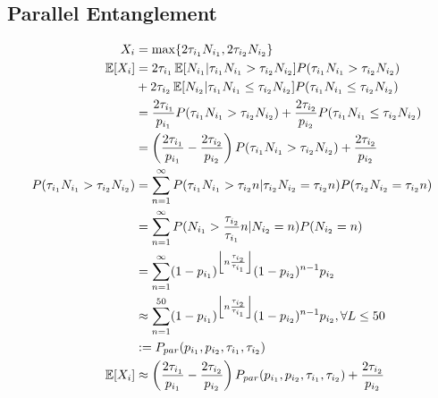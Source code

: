 \subsection{Parallel Entanglement}
\begingroup
\allowdisplaybreaks
\begin{align*}
    X_i                                      & = \max\{2\tau_{i_1}N_{i_1}, 2\tau_{i_2}N_{i_2}\}                                                                                                            \\
    \operatorname*{\mathbb{E}}[X_i]                                  & = 2\tau_{i_1}\operatorname*{\mathbb{E}}[N_{i_1}|\tau_{i_1}N_{i_1} > \tau_{i_2}N_{i_2}]P(\tau_{i_1}N_{i_1} > \tau_{i_2}N_{i_2})                                                      \\
                                             & + 2\tau_{i_2}\operatorname*{\mathbb{E}}[N_{i_2}|\tau_{i_1}N_{i_1} \leq \tau_{i_2}N_{i_2}]P(\tau_{i_1}N_{i_1} \leq \tau_{i_2}N_{i_2})                                                \\
                                             & = \frac{2\tau_{i_1}}{p_{i_1}}P(\tau_{i_1}N_{i_1} > \tau_{i_2}N_{i_2})+\frac{2\tau_{i_2}}{p_{i_2}}P(\tau_{i_1}N_{i_1} \leq \tau_{i_2}N_{i_2})                \\
                                             & = \left(\frac{2\tau_{i_1}}{p_{i_1}} - \frac{2\tau_{i_2}}{p_{i_2}}\right)P(\tau_{i_1}N_{i_1} > \tau_{i_2}N_{i_2}) + \frac{2\tau_{i_2}}{p_{i_2}}              \\
    P(\tau_{i_1}N_{i_1} > \tau_{i_2}N_{i_2}) & = \sum_{n=1}^{\infty}P(\tau_{i_1}N_{i_1} > \tau_{i_2}n | \tau_{i_2}N_{i_2} = \tau_{i_2}n)P(\tau_{i_2}N_{i_2}=\tau_{i_2}n)                                   \\
                                             & = \sum_{n=1}^{\infty}P(N_{i_1} > \frac{\tau_{i_2}}{\tau_{i_1}}n | N_{i_2} = n)P(N_{i_2}=n)                                                                  \\
                                             & = \sum_{n=1}^{\infty}(1-p_{i_1})^{\left\lfloor{n\frac{\tau_{i_2}}{\tau_{i_1}}}\right\rfloor}(1-p_{i_2})^{n-1}p_{i_2}                                        \\
                                             & \approx \sum_{n=1}^{50}(1-p_{i_1})^{\left\lfloor{n\frac{\tau_{i_2}}{\tau_{i_1}}}\right\rfloor}(1-p_{i_2})^{n-1}p_{i_2},\forall L \leq 50                    \\
                                             & :=P_{par}(p_{i_1},p_{i_2},\tau_{i_1},\tau_{i_2})                                                                                                            \\
    \operatorname*{\mathbb{E}}[X_i]                                  & \approx \left(\frac{2\tau_{i_1}}{p_{i_1}} - \frac{2\tau_{i_2}}{p_{i_2}}\right) P_{par}(p_{i_1},p_{i_2},\tau_{i_1},\tau_{i_2}) + \frac{2\tau_{i_2}}{p_{i_2}}
\end{align*}
\endgroup
